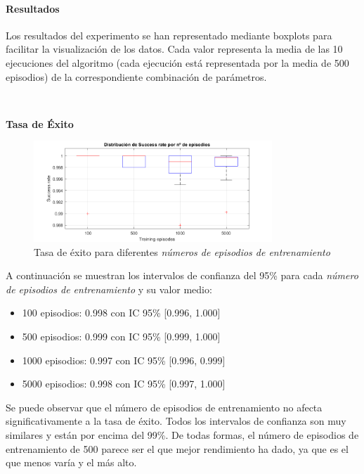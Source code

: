 \paragraph{Resultados}

Los resultados del experimento se han representado mediante boxplots para facilitar la visualización de los datos. Cada valor representa la media de las 10 ejecuciones del algoritmo (cada ejecución está representada por la media de 500 episodios) de la correspondiente combinación de parámetros. 

\

\textbf{Tasa de Éxito}

\begin{figure}[H]
    \centering
    \includegraphics[width=0.8\textwidth]{../../experiments/directEstimation/experiment-2/results/success.png}
    \caption{Tasa de éxito para diferentes \textit{números de episodios de entrenamiento}}
    \label{fig:directEstimation2-success}
\end{figure}

A continuación se muestran los intervalos de confianza del 95\% para cada \textit{número de episodios de entrenamiento} y su valor medio:
\begin{itemize}
    \item 100 episodios: 0.998 con IC 95\% [0.996,  1.000]
    \item 500 episodios: 0.999 con IC 95\% [0.999,  1.000]
    \item 1000 episodios: 0.997 con IC 95\% [0.996,  0.999]
    \item 5000 episodios: 0.998 con IC 95\% [0.997,  1.000]
\end{itemize}

Se puede observar que el número de episodios de entrenamiento no afecta significativamente a la tasa de éxito. Todos los intervalos de confianza son muy similares y están por encima del 99\%. De todas formas, el número de episodios de entrenamiento de 500 parece ser el que mejor rendimiento ha dado, ya que es el que menos varía y el más alto.

